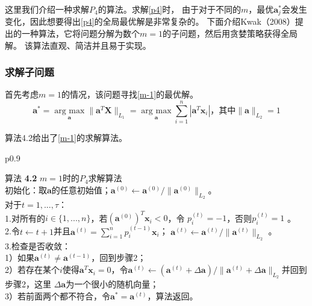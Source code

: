这里我们介绍一种求解$P_4$的算法。求解\ref{p4}时，
由于对于不同的$m$，最优$\bm a_j^*$会发生变化，因此想要得出\ref{p4}的全局最优解是非常复杂的。
下面介绍Kwak（2008）提出的一种算法\cite{kwak2008principal}，它将问题分解为数个$m=1$的子问题，然后用贪婪策略获得全局解。
该算法直观、简洁并且易于实现。
\subsubsection{求解子问题}

首先考虑$m = 1$的情况，该问题寻找\eqref{m-1}的最优解。
\begin{equation}\label{m-1}
    \bm a^* = \underset{\bm a}{\operatorname{arg\ max}}\| \bm a ^T \bm{X}\|_{L_1}
    = \underset{\bm a}{\operatorname{arg\ max}}\sum_{i=1}^n|\bm a^T\bm x_i|
    \text{，其中}\|\bm a\|_{L_2} = 1
\end{equation}

算法4.2给出了\eqref{m-1}的求解算法。
\begin{table}[H]%
    \centering%
    \begin{tabular}{{p{0.9\columnwidth}}}%
    
    \toprule%
    {\heiti 算法} {\bf 4.2} $m=1$时的$P_4$求解算法\\
    \midrule%
        初始化：取$\bm a$的任意初始值；$\bm a^{(0)}\leftarrow \bm a^{(0)}/\|\bm a^{(0)}\|_{L_2}$。 \\
        对于$t = 1, ..., \tau$：\\
            1.对所有的$i \in \{1, ..., n\}$，若${(\bm a^{(0)})}^T\bm x_i < 0$，令
            $p_i^{(t)} = -1 $，否则$p_i^{(t)} = 1$ 。\\
            2.令$t \leftarrow t+1$并且$\bm a^{(t)} = \sum_{i=1}^np_i^{(t-1)}\bm x_i$；
            $\bm a^{(t)} \leftarrow \bm a^{(t)}/ \|\bm a^{(t)}\|_{L_2}$ 。\\
            3.检查是否收敛：\\
            1）如果$\bm a^{(t)} \neq \bm a^{(t-1)}$，回到步骤2；\\
            2）若存在某个$i$使得$\bm a^T\bm x_i = 0$，令$\bm a^{(t)} \leftarrow
            (\bm a^{(t)} + \Delta \bm a)/\|\bm a^{(t)} + \Delta \bm a\|_{L_2}$并回到步骤2，这里
            $\Delta \bm a$为一个很小的随机向量； \\
            3）若前面两个都不符合，令$\bm a^* = \bm a^{(t)}$，算法返回。\\
    \bottomrule%
    \end{tabular}
\end{table}%

